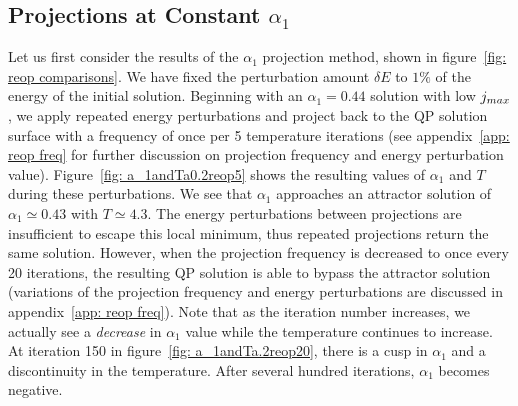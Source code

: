 \documentclass[../PhD.tex]{subfiles}
\begin{document}

\subsection{Projections at Constant $\alpha_1$}
\label{ssec: a1 projections}

Let us first consider the results of the $\alpha_1$ projection method, shown in figure~\ref{fig: reop comparisons}. We have fixed the perturbation amount $\delta E$ to $1\%$ of the energy of the initial solution. Beginning with an $\alpha_1 = 0.44$ solution with low $j_{max}$, we apply repeated energy perturbations and project back to the QP solution surface with a frequency of once per 5 temperature iterations (see appendix~\ref{app: reop freq} for further discussion  on projection frequency and energy perturbation value). Figure~\ref{fig: a_1andTa0.2reop5} shows the resulting values of $\alpha_1$ and $T$ during these perturbations. We see that $\alpha_1$ approaches an attractor solution of $\alpha_1 \simeq 0.43$ with $T \simeq 4.3$. The energy perturbations between projections are insufficient to escape this local minimum, thus repeated projections return the same solution. However, when the projection frequency is decreased to once every 20 iterations, the resulting QP solution is able to bypass the attractor solution (variations of the projection frequency and energy perturbations are discussed in appendix~\ref{app: reop freq}). Note that as the iteration number increases, we actually see a \emph{decrease} in $\alpha_1$ value while the temperature continues to increase. At iteration 150 in figure~\ref{fig: a_1andTa.2reop20}, there is a cusp in $\alpha_1$ and a discontinuity in the temperature. After several hundred iterations, $\alpha_1$ becomes negative.

\vspace{0.15in}
\end{document}
